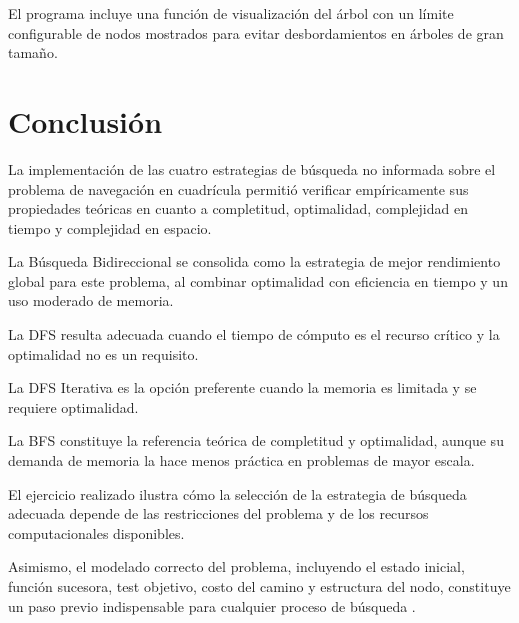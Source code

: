 \documentclass{article}
\begin{document}
El programa incluye una función de visualización del árbol con un
límite configurable de nodos mostrados para evitar desbordamientos
en árboles de gran tamaño.


\section{Conclusión}

La implementación de las cuatro estrategias de búsqueda no informada
sobre el problema de navegación en cuadrícula permitió verificar
empíricamente sus propiedades teóricas en cuanto a completitud,
optimalidad, complejidad en tiempo y complejidad en espacio.

La Búsqueda Bidireccional se consolida como la estrategia de mejor
rendimiento global para este problema, al combinar optimalidad con
eficiencia en tiempo y un uso moderado de memoria.

La DFS resulta adecuada cuando el tiempo de cómputo es el recurso
crítico y la optimalidad no es un requisito.

La DFS Iterativa es la opción preferente cuando la memoria es limitada
y se requiere optimalidad.

La BFS constituye la referencia teórica de completitud y optimalidad,
aunque su demanda de memoria la hace menos práctica en problemas de
mayor escala.

El ejercicio realizado ilustra cómo la selección de la estrategia de
búsqueda adecuada depende de las restricciones del problema y de los
recursos computacionales disponibles.

Asimismo, el modelado correcto del problema, incluyendo el estado
inicial, función sucesora, test objetivo, costo del camino y estructura
del nodo, constituye un paso previo indispensable para cualquier
proceso de búsqueda \cite{russell2021artificial}.


\newpage

\nocite{nilsson1998artificial}
\nocite{poole2010computational}

\printbibliography[
    heading=bibintoc,
    title={Referencias Bibliográficas}
]

\end{document}
